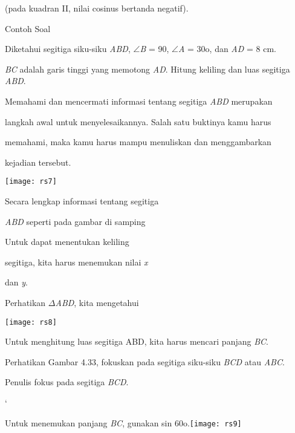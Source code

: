 \documentclass[11pt,fleqn]{book} %
\begin{document}
\begin{myEnumerate}
\begin{itemize}
\noindent  (pada kuadran II, nilai cosinus bertanda negatif).

\noindent 

\noindent Contoh Soal

\noindent 

\noindent Diketahui segitiga siku-siku \textit{ABD}, $\mathrm{\angle }$\textit{B }= 90, $\mathrm{\angle }$\textit{A }= 30o, dan \textit{AD }= 8 cm.

\noindent \textit{BC }adalah garis tinggi yang memotong \textit{AD}. Hitung keliling dan luas segitiga \textit{ABD}.

\noindent 

\noindent Memahami dan mencermati informasi tentang segitiga \textit{ABD }merupakan

\noindent langkah awal untuk menyelesaikannya. Salah satu buktinya kamu harus

\noindent memahami, maka kamu harus mampu menuliskan dan menggambarkan

\noindent kejadian tersebut.

\noindent \texttt{[image: rs7]}\textbf{}

\noindent Secara lengkap informasi tentang segitiga

\noindent \textit{ABD }seperti pada gambar di samping

\noindent Untuk dapat menentukan keliling

\noindent segitiga, kita harus menemukan nilai \textit{x}

\noindent dan \textit{y}.

\noindent 

\noindent Perhatikan $\Delta$\textit{ABD}, kita mengetahui

\noindent 

\noindent \texttt{[image: rs8]}

\noindent 

\noindent Untuk menghitung luas segitiga ABD, kita harus mencari panjang \textit{BC}.

\noindent Perhatikan Gambar 4.33, fokuskan pada segitiga siku-siku \textit{BCD }atau \textit{ABC}.

\noindent Penulis fokus pada segitiga \textit{BCD}.

\noindent `

\noindent Untuk menemukan panjang \textit{BC}, gunakan sin 60o.\texttt{[image: rs9]}
\noindent


\end{itemize}
\end{myEnumerate}
\end{document}
